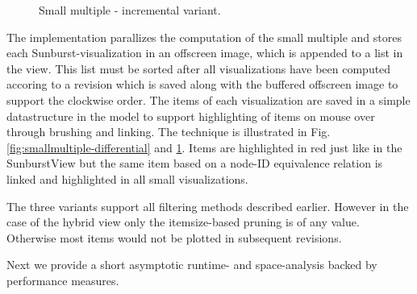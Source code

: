 \begin{itemize}
\begin{figure}[tb]
\caption{\label{fig:smallmultiple-incremental} Small multiple - incremental variant.}
\end{figure}
\end{itemize}

The implementation parallizes the computation of the small multiple and stores each Sunburst-visualization in an offscreen image, which is appended to a list in the view. This list must be sorted after all visualizations have been computed accoring to a revision which is saved along with the buffered offscreen image to support the clockwise order. The items of each visualization are saved in a simple datastructure in the model to support highlighting of items on mouse over through brushing and linking. The technique is illustrated in Fig. \ref{fig:smallmultiple-differential} and \ref{fig:smallmultiple-incremental}. Items are highlighted in red just like in the SunburstView but the same item based on a node-ID equivalence relation is linked and highlighted in all small visualizations.

The three variants support all filtering methods described earlier. However in the case of the hybrid view only the itemsize-based pruning is of any value. Otherwise most items would not be plotted in subsequent revisions.

Next we provide a short asymptotic runtime- and space-analysis backed by performance measures.


